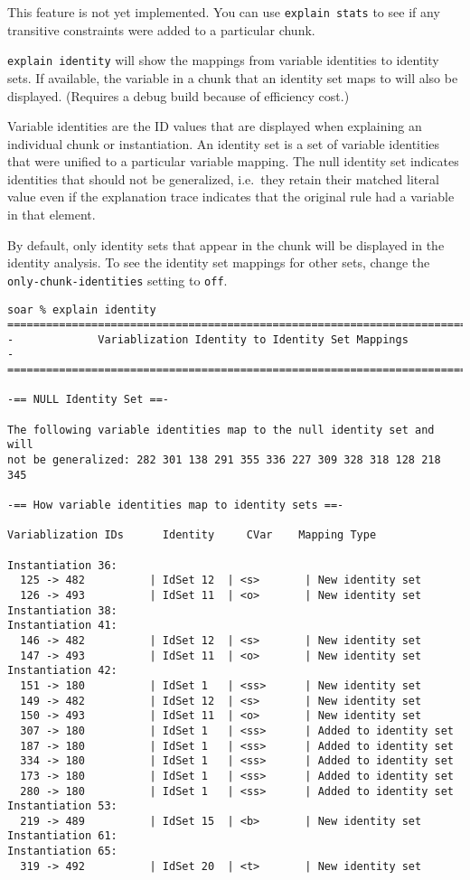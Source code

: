 This feature is not yet implemented. You can use \texttt{explain\ stats}
to see if any transitive constraints were added to a particular chunk.

\textbf{}

\texttt{explain\ identity} will show the mappings from variable
identities to identity sets. If available, the variable in a chunk that
an identity set maps to will also be displayed. (Requires a debug build
because of efficiency cost.)

Variable identities are the ID values that are displayed when explaining
an individual chunk or instantiation. An identity set is a set of
variable identities that were unified to a particular variable mapping.
The null identity set indicates identities that should not be
generalized, i.e.~they retain their matched literal value even if the
explanation trace indicates that the original rule had a variable in
that element.

By default, only identity sets that appear in the chunk will be
displayed in the identity analysis. To see the identity set mappings for
other sets, change the \texttt{only-chunk-identities} setting to
\texttt{off}.

\begin{verbatim}
soar % explain identity
=========================================================================
-             Variablization Identity to Identity Set Mappings          -
=========================================================================

-== NULL Identity Set ==-

The following variable identities map to the null identity set and will
not be generalized: 282 301 138 291 355 336 227 309 328 318 128 218 345

-== How variable identities map to identity sets ==-

Variablization IDs      Identity     CVar    Mapping Type

Instantiation 36:
  125 -> 482          | IdSet 12  | <s>       | New identity set
  126 -> 493          | IdSet 11  | <o>       | New identity set
Instantiation 38:
Instantiation 41:
  146 -> 482          | IdSet 12  | <s>       | New identity set
  147 -> 493          | IdSet 11  | <o>       | New identity set
Instantiation 42:
  151 -> 180          | IdSet 1   | <ss>      | New identity set
  149 -> 482          | IdSet 12  | <s>       | New identity set
  150 -> 493          | IdSet 11  | <o>       | New identity set
  307 -> 180          | IdSet 1   | <ss>      | Added to identity set
  187 -> 180          | IdSet 1   | <ss>      | Added to identity set
  334 -> 180          | IdSet 1   | <ss>      | Added to identity set
  173 -> 180          | IdSet 1   | <ss>      | Added to identity set
  280 -> 180          | IdSet 1   | <ss>      | Added to identity set
Instantiation 53:
  219 -> 489          | IdSet 15  | <b>       | New identity set
Instantiation 61:
Instantiation 65:
  319 -> 492          | IdSet 20  | <t>       | New identity set
\end{verbatim}

